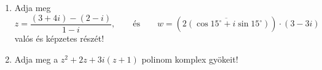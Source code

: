 \documentclass[11pt]{scrartcl}
\begin{document}
\begin{enumerate}
	\item Adja meg
	      \[
		      z = \frac{(3 + 4i) - (2 - i)}{1 - i}, \qquad \text{és} \qquad
		      w = \left(\overline{2(\cos 15^\circ + i \sin 15^\circ)}\right) \cdot (3 - 3i)
	      \]
	      valós és képzetes részét!

	\item Adja meg a $z^2 + 2z + 3i(z + 1)$ polinom komplex gyökeit!
\end{enumerate}
\end{document}
